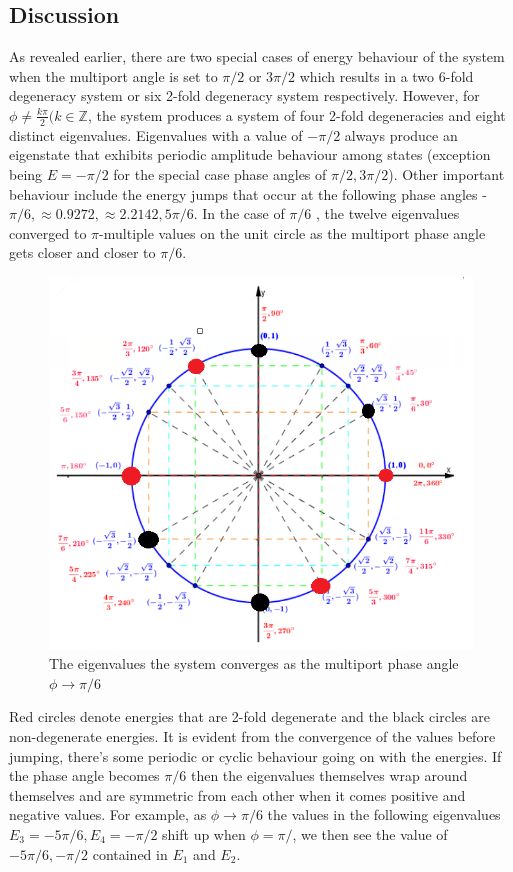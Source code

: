\subsection{Discussion}
As revealed earlier, there are two special cases of energy behaviour of the system when the multiport angle is set to $\pi/2$ or $3\pi/2$ which results in a two 6-fold degeneracy system or six 2-fold degeneracy system respectively. 
\newline 
However, for $\phi \neq \frac{k\pi}{2} (k \in \mathbb{Z}$, the system produces a system of four 2-fold degeneracies and eight distinct eigenvalues. \newline
Eigenvalues with a value of $-\pi/2$ always produce an eigenstate that exhibits periodic amplitude behaviour among states (exception being $E=-\pi/2$ for the special case phase angles of $\pi/2, 3\pi/2$). \newline
Other important behaviour include the energy jumps that occur at the following phase angles - $\pi/6, \approx 0.9272,\approx 2.2142,5\pi/6$. \newline
In the case of $\pi/6$ , the twelve eigenvalues converged to $\pi$-multiple values on the unit circle as the multiport phase angle gets closer and closer to $\pi/6$. 
\begin{figure}[H]
    \centering
    \includegraphics{2_Body/Figures/symmetry_01.png}
    \caption{The eigenvalues the system converges as the multiport phase angle $\phi \rightarrow \pi/6$}
    \label{fig:my_label}
\end{figure}
Red circles denote energies that are 2-fold degenerate and the black circles are non-degenerate energies. It is evident from the convergence of the values before jumping, there's some periodic or cyclic behaviour going on with the energies. If the phase angle becomes $\pi/6$ then the eigenvalues themselves wrap around themselves and are symmetric from each other when it comes positive and negative values. \newline
For example, as $\phi \rightarrow \pi/6$ the values in the following eigenvalues $E_{3} = -5\pi/6, E_{4} = -\pi/2$ shift up when $\phi = \pi/$, we then see the value of $-5\pi/6, -\pi/2$ contained in $E_{1}$ and $E_{2}$. 
